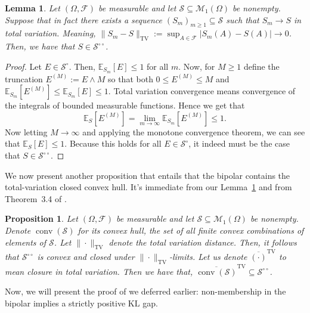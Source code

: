 \documentclass[11pt]{article}
\newcommand{\KL}{\mathrm{KL}}
\newcommand{\E}{\mathbb{E}}
\newtheorem{proposition}[theorem]{Proposition}
\newtheorem{lemma}[theorem]{Lemma}
\theoremstyle{definition}
\theoremstyle{definition}
\begin{document}
\begin{lemma}\label{lem:tv-bipolar}
Let $(\Omega, \mathcal F)$ be measurable and let $\mathcal S\subseteq \mathcal M_1(\Omega)$ be nonempty. Suppose that in fact there exists a sequence $(S_m)_{m\ge 1}\subseteq\mathcal S$ such that $S_m\to S$ in total variation. Meaning, $\|S_m-S\|_{\mathrm{TV}}:=\sup_{A\in\mathcal F}|S_m(A)-S(A)|\longrightarrow 0$. Then, we have that $S\in\mathcal S^{\circ\circ}$.  
\end{lemma}

\begin{proof}
Let $E\in\mathcal S^\circ$. Then, $\E_{S_m}[E]\le 1$ for all $m$. Now, for $M\ge 1$ define the truncation $E^{(M)}:=E\wedge M$ so that both $0\le E^{(M)}\le M$ and $\E_{S_m}[E^{(M)}]\le \E_{S_m}[E]\le 1$. Total variation convergence means convergence of the integrals of bounded measurable functions. Hence we get that
\[
\E_S[E^{(M)}]=\lim_{m\to\infty}\E_{S_m}[E^{(M)}]\le 1.
\]
Now letting $M\to\infty$ and applying the monotone convergence theorem, we can see that $\E_S[E]\le 1$. Because this holds for all $E\in\mathcal S^{\circ}$, it indeed must be the case that $S\in\mathcal S^{\circ\circ}$.
\end{proof}

We now present another proposition that entails that the bipolar contains the total-variation closed convex hull. It's immediate from our Lemma~\ref{lem:tv-bipolar} and from Theorem~3.4 of \cite{larsson2026completecharacterizationtestablehypotheses}.

\begin{proposition}\label{prop:bipolar-tvconv}
Let $(\Omega, \mathcal F)$ be measurable and let $\mathcal S\subseteq \mathcal M_1(\Omega)$ be nonempty. Denote $\operatorname{conv}(\mathcal S)$ for its convex hull, the set of all finite convex combinations of elements of $\mathcal S$. 
Let $\|\cdot\|_{\mathrm{TV}}$ denote the total variation distance. Then, it follows that $\mathcal S^{\circ\circ}$ is convex and closed under $\|\cdot\|_{\mathrm{TV}}$-limits. Let us denote $\overline{(\cdot)}^{\mathrm{TV}}$ to mean closure in total variation. Then we have that, $\overline{\operatorname{conv}(\mathcal{S})}^{\mathrm{TV}}\subseteq \mathcal S^{\circ\circ}$.
\end{proposition}

Now, we will present the proof of we deferred earlier: non-membership in the bipolar implies a strictly positive $\KL$ gap. 
\end{document}
